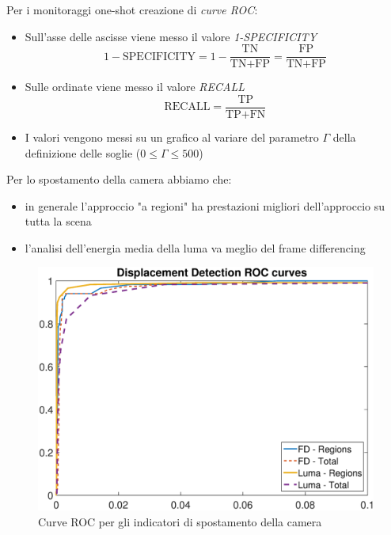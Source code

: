 Per i monitoraggi one-shot creazione di \textit{curve ROC}:
\begin{itemize}
	\item Sull'asse delle ascisse viene messo il valore \textit{1-SPECIFICITY}
	\[1-\text{SPECIFICITY}= 1-\frac{\text{TN}}{\text{TN}+\text{FP}}=\frac{\text{FP}}{\text{TN}+\text{FP}}\]
	\item Sulle ordinate viene messo il valore \textit{RECALL}
	\[\text{RECALL}=\frac{\text{TP}}{\text{TP}+\text{FN}} \]
	\item I valori vengono messi su un grafico al variare del parametro $\Gamma$ della definizione delle soglie ($0 \leq \Gamma \leq 500$)
\end{itemize}


Per lo spostamento della camera abbiamo che:
\begin{itemize}
	\item in generale l'approccio "a regioni" ha prestazioni migliori dell'approccio su tutta la scena
	\item l'analisi dell'energia media della luma va meglio del frame differencing
\end{itemize}
\begin{figure}[tb]
\centering
\includegraphics[width=13cm]{diagrammi/ROC_displacement}
\caption{Curve ROC per gli indicatori di spostamento della camera}
\label{fig:ROC_displacement}
\end{figure}

